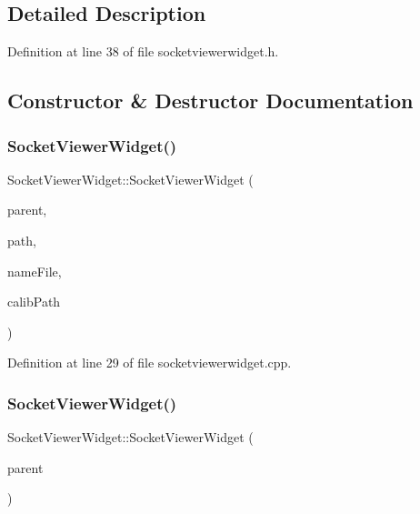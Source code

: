 \subsection{Detailed Description}


Definition at line 38 of file socketviewerwidget.\+h.



\subsection{Constructor \& Destructor Documentation}
\mbox{\label{class_socket_viewer_widget_a6ea05cd5925269a85c333bc47cc58db9}} 
\subsubsection{\texorpdfstring{SocketViewerWidget()}{SocketViewerWidget()}\hspace{0.1cm}{\footnotesize\ttfamily [1/2]}}
{\footnotesize\ttfamily Socket\+Viewer\+Widget\+::\+Socket\+Viewer\+Widget (\begin{DoxyParamCaption}\item[{Q\+Widget $\ast$}]{parent,  }\item[{Q\+String}]{path,  }\item[{Q\+String}]{name\+File,  }\item[{Q\+String}]{calib\+Path }\end{DoxyParamCaption})}



Definition at line 29 of file socketviewerwidget.\+cpp.

\mbox{\label{class_socket_viewer_widget_a922875865025866e34c65df9ed494295}} 
\subsubsection{\texorpdfstring{SocketViewerWidget()}{SocketViewerWidget()}\hspace{0.1cm}{\footnotesize\ttfamily [2/2]}}
{\footnotesize\ttfamily Socket\+Viewer\+Widget\+::\+Socket\+Viewer\+Widget (\begin{DoxyParamCaption}\item[{Q\+Widget $\ast$}]{parent }\end{DoxyParamCaption})}



